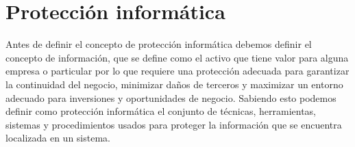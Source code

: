 \chapter{Protección informática}
\label{cha:proteccion-informatica}
Antes de definir el concepto de protección informática debemos definir el concepto de información, que se define como el activo que tiene valor para alguna empresa o particular por lo que requiere una protección adecuada para garantizar la continuidad del negocio, minimizar daños de terceros y maximizar un entorno adecuado para inversiones y oportunidades de negocio. Sabiendo esto podemos definir como protección informática el conjunto de técnicas, herramientas, sistemas y procedimientos usados para proteger la información que se encuentra localizada en un sistema.
